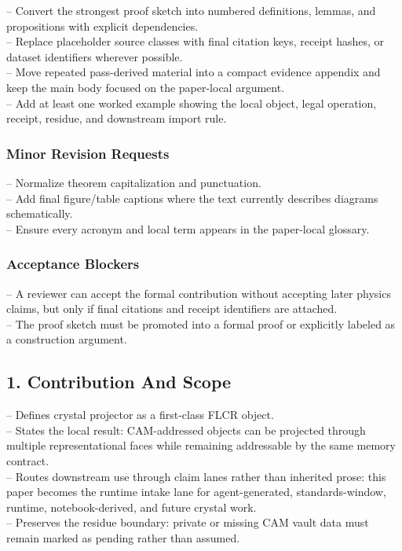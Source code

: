 \documentclass[11pt]{article}
\begin{document}
\noindent{}-- Convert the strongest proof sketch into numbered definitions, lemmas, and propositions with explicit dependencies.\\
\noindent{}-- Replace placeholder source classes with final citation keys, receipt hashes, or dataset identifiers wherever possible.\\
\noindent{}-- Move repeated pass-derived material into a compact evidence appendix and keep the main body focused on the paper-local argument.\\
\noindent{}-- Add at least one worked example showing the local object, legal operation, receipt, residue, and downstream import rule.\\

\subsubsection*{Minor Revision Requests}

\noindent{}-- Normalize theorem capitalization and punctuation.\\
\noindent{}-- Add final figure/table captions where the text currently describes diagrams schematically.\\
\noindent{}-- Ensure every acronym and local term appears in the paper-local glossary.\\

\subsubsection*{Acceptance Blockers}

\noindent{}-- A reviewer can accept the formal contribution without accepting later physics claims, but only if final citations and receipt identifiers are attached.\\
\noindent{}-- The proof sketch must be promoted into a formal proof or explicitly labeled as a construction argument.\\


\subsection*{1. Contribution And Scope}

\noindent{}-- Defines crystal projector as a first-class FLCR object.\\
\noindent{}-- States the local result: CAM-addressed objects can be projected through multiple representational faces while remaining addressable by the same memory contract.\\
\noindent{}-- Routes downstream use through claim lanes rather than inherited prose: this paper becomes the runtime intake lane for agent-generated, standards-window, runtime, notebook-derived, and future crystal work.\\
\noindent{}-- Preserves the residue boundary: private or missing CAM vault data must remain marked as pending rather than assumed.\\
\end{document}
